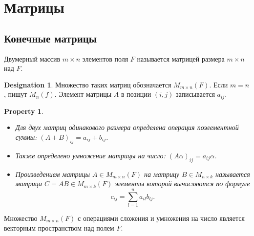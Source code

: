 \documentclass[11pt]{book}
\theoremstyle{definition}
\theoremstyle{plain}
\theoremstyle{plain}
\newtheorem*{prop}{Property}
\theoremstyle{definition}
\newtheorem*{name}{Designation}
\theoremstyle{remark}
\begin{document}
\section{Матрицы}
\subsection{Конечные матрицы}
\begin{defn}
    Двумерный массив  $ m \times n$ элементов поля $ F$ называется матрицей размера  $ m \times  n$ над $ F$.
    \begin{name}
	Множество таких матриц  обозначается $ M_{m \times n}(F)$. Если $ m = n$, пишут  $ M_n(f)$.  
    Элемент матрицы $ A$ в позиции  $ (i, j)$ записывается  $ a_{ij}$.
    \end{name}
\end{defn}
\begin{prop}
    $ $
    \begin{itemize}
	\item Для двух матриц одинакового размера определена операция поэлементной суммы: $ (A + B)_{ij} = a_{ij } + b_{ij}$.
	\item Также определено умножение матрицы на число: $ (A\alpha)_{ij } = a_{ij} \alpha$.
	\item Произведением матрицы $ A \in M_{m \times n}(F)$ на матрицу $ B \in M_{n \times k}$  называется матрица $ C = AB \in M_{m \times  k}(F)$ элементы которой вычисляются по формуле
	    \[
	    c_{ij} = \sum _{l=1}^{n}a_{il}b_{lj}
	    .\] 
    \end{itemize}
\end{prop}
\begin{thm}\label{prop_multi_matr}
    Множество $ M_{m \times n}(F)$ с операциями сложения и умножения на число является векторным пространством над полем $ F$.
\end{thm}
\end{document}
